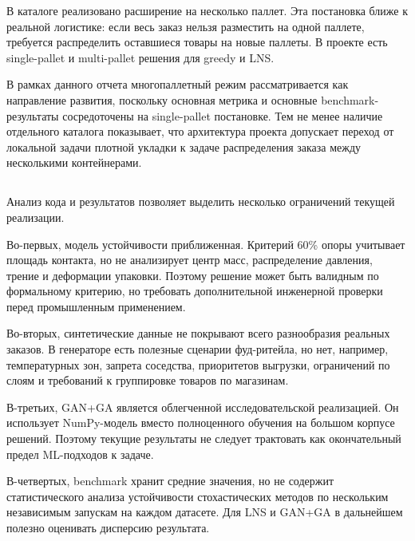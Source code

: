 В каталоге  реализовано расширение на несколько паллет. Эта постановка ближе к реальной логистике: если весь заказ нельзя разместить на одной паллете, требуется распределить оставшиеся товары на новые паллеты. В проекте есть single-pallet и multi-pallet решения для greedy и LNS.

В рамках данного отчета многопаллетный режим рассматривается как направление развития, поскольку основная метрика и основные benchmark-результаты сосредоточены на single-pallet постановке. Тем не менее наличие отдельного каталога  показывает, что архитектура проекта допускает переход от локальной задачи плотной укладки к задаче распределения заказа между несколькими контейнерами.

\subsection{}

Анализ кода и результатов позволяет выделить несколько ограничений текущей реализации.

Во-первых, модель устойчивости приближенная. Критерий 60\% опоры учитывает площадь контакта, но не анализирует центр масс, распределение давления, трение и деформации упаковки. Поэтому решение может быть валидным по формальному критерию, но требовать дополнительной инженерной проверки перед промышленным применением.

Во-вторых, синтетические данные не покрывают всего разнообразия реальных заказов. В генераторе есть полезные сценарии фуд-ритейла, но нет, например, температурных зон, запрета соседства, приоритетов выгрузки, ограничений по слоям и требований к группировке товаров по магазинам.

В-третьих, GAN+GA является облегченной исследовательской реализацией. Он использует NumPy-модель вместо полноценного обучения на большом корпусе решений. Поэтому текущие результаты не следует трактовать как окончательный предел ML-подходов к задаче.

В-четвертых, benchmark хранит средние значения, но не содержит статистического анализа устойчивости стохастических методов по нескольким независимым запускам на каждом датасете. Для LNS и GAN+GA в дальнейшем полезно оценивать дисперсию результата.

\subsection{}

